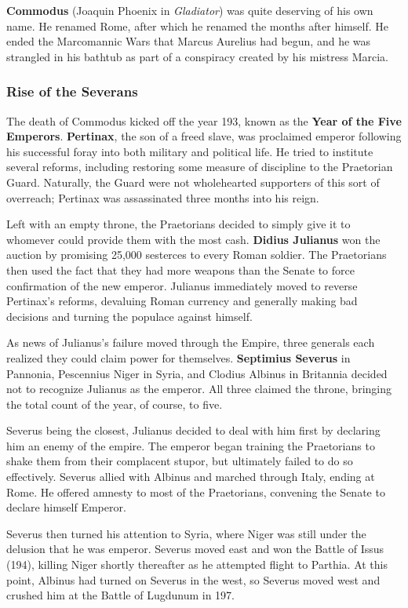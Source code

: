 \textbf{Commodus} (Joaquin Phoenix in \textit{Gladiator}) was quite deserving of his own name.
He renamed Rome, after which he renamed the months after himself.
He ended the Marcomannic Wars that Marcus Aurelius had begun,
and he was strangled in his bathtub as part of a conspiracy created by his mistress Marcia.

\subsubsection*{Rise of the Severans}

The death of Commodus kicked off the year 193, known as the \textbf{Year of the Five Emperors}.
\textbf{Pertinax}, the son of a freed slave,
was proclaimed emperor following his successful foray into both military and political life.
He tried to institute several reforms,
including restoring some measure of discipline to the Praetorian Guard.
Naturally, the Guard were not wholehearted supporters of this sort of overreach;
Pertinax was assassinated three months into his reign.

Left with an empty throne,
the Praetorians decided to simply give it to whomever could provide them with the most cash.
\textbf{Didius Julianus} won the auction by promising 25,000 sesterces to every Roman soldier.
The Praetorians then used the fact that they had more weapons than the Senate
to force confirmation of the new emperor.
Julianus immediately moved to reverse Pertinax's reforms,
devaluing Roman currency and generally making bad decisions
and turning the populace against himself.

As news of Julianus's failure moved through the Empire,
three generals each realized they could claim power for themselves.
\textbf{Septimius Severus} in Pannonia,
Pescennius Niger in Syria,
and Clodius Albinus in Britannia
decided not to recognize Julianus as the emperor.
All three claimed the throne, bringing the total count of the year, of course, to five.

Severus being the closest,
Julianus decided to deal with him first by declaring him an enemy of the empire.
The emperor began training the Praetorians to shake them from their complacent stupor,
but ultimately failed to do so effectively.
Severus allied with Albinus and marched through Italy, ending at Rome.
He offered amnesty to most of the Praetorians,
convening the Senate to declare himself Emperor.

Severus then turned his attention to Syria,
where Niger was still under the delusion that he was emperor.
Severus moved east and won the Battle of Issus (194),
killing Niger shortly thereafter as he attempted flight to Parthia.
At this point, Albinus had turned on Severus in the west,
so Severus moved west and crushed him at the Battle of Lugdunum in 197.


